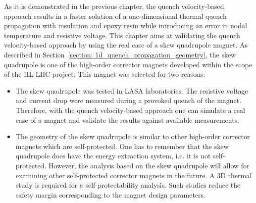 As it is demonstrated in the previous chapter, the quench velocity-based approach results in a faster solution of a one-dimensional thermal quench propagation with insulation and epoxy resin while introducing an error in nodal temperature and resistive voltage. This chapter aims at validating the quench velocity-based approach by using the real case of a skew quadrupole magnet.
As described in Section~\ref{section: 1d_quench_propagation_geometry}, the skew quadrupole is one of the high-order corrector magnets developed within the scope of the HL-LHC project. This magnet was selected for two reasons: 
\begin{itemize}
    \item The skew quadrupole was tested in LASA laboratories. The resistive voltage and current drop were measured during a provoked quench of the magnet. Therefore, with the quench velocity-based approach one can simulate a real case of a magnet and validate the results against available measurements. 
    \item The geometry of the skew quadrupole is similar to other high-order corrector magnets which are self-protected. One has to remember that the skew quadrupole does have the energy extraction system, i.e. it is not self-protected. However, the analysis based on the skew quadrupole will allow for examining other self-protected corrector magnets in the future. A 3D thermal study is required for a self-protectability analysis. Such studies reduce the safety margin corresponding to the magnet design parameters. 
\end{itemize}

